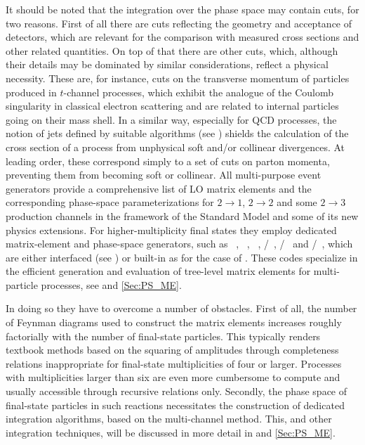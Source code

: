 It should be noted that the integration over the phase space may contain
cuts, for two reasons. First of all there are cuts reflecting the
geometry and acceptance of detectors, which are relevant for
the comparison with measured cross sections and other
related quantities.  On top of that there are other cuts, which, although
their details may be dominated by similar considerations, reflect
a physical necessity.  These are, for instance, cuts on the transverse
momentum of particles produced in $t$-channel processes, which exhibit
the analogue of the Coulomb singularity in classical electron scattering
and are related to internal particles going on their mass shell.  In a
similar way, especially for QCD processes, the notion of jets defined
by suitable algorithms (see ) shields the 
calculation of the cross section of a process from unphysical soft and/or
collinear divergences.  
At leading order, these correspond simply to a set of cuts on parton momenta, 
preventing them from becoming soft or collinear.
All multi-purpose event generators provide a comprehensive list of LO 
matrix elements and the corresponding phase-space parameterizations for 
$2\to 1$, $2\to 2$ and some $2\to 3$ production channels in the 
framework of the Standard Model and some of its new physics extensions. 
For higher-multiplicity final states they employ dedicated matrix-element
and phase-space generators, such as \Alpgen~\cite{Mangano:2002ea}, 
\Amegic~\cite{Krauss:2001iv}, \Comix~\cite{Gleisberg:2008fv}, 
\Helac/\Phegas~\cite{Kanaki:2000ey,Papadopoulos:2000tt}, 
\Madgraph/\Madevent~\cite{Stelzer:1994ta,Maltoni:2002qb} and
\Whizard/\OmegaCode~\cite{Moretti:2001zz,Kilian:2007gr}, which are 
either interfaced (see ) or built-in 
as for the case of \Sherpa.  These codes specialize in the efficient 
generation and evaluation of tree-level matrix elements for multi-particle 
processes, see  and \ref{Sec:PS_ME}.  

In doing so they have to overcome a number of obstacles. First of all, the 
number of Feynman diagrams used to construct the matrix elements increases
roughly factorially with the number of final-state particles.  This
typically renders textbook methods based on the squaring of amplitudes through
completeness relations inappropriate for final-state multiplicities of four 
or larger.  Processes with multiplicities larger than six are even more
cumbersome to compute and usually accessible through recursive relations only.
Secondly, the phase space of final-state particles in such reactions
necessitates the construction of dedicated integration algorithms, based on
the multi-channel method.  This, and other integration techniques, will be
discussed in more detail in  and \ref{Sec:PS_ME}.

